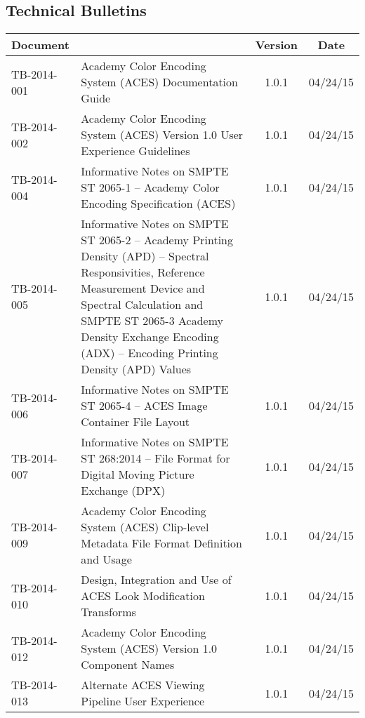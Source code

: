 \documentclass[10pt]{academydoc}
\begin{document}
\subsection*{Technical Bulletins}
\begin{tabularx}{\linewidth}{|l X|c|c|}
\hline
\textbf{Document} & & \textbf{Version} & \textbf{Date} \\ \hline
TB-2014-001 & Academy Color Encoding System (ACES) Documentation Guide & 1.0.1 & 04/24/15 \\ \hline
TB-2014-002 & Academy Color Encoding System (ACES) Version 1.0 User Experience Guidelines & 1.0.1 & 04/24/15 \\ \hline
TB-2014-004 & Informative Notes on SMPTE ST 2065-1 -- Academy Color Encoding Specification (ACES) & 1.0.1 & 04/24/15 \\ \hline
TB-2014-005 & Informative Notes on SMPTE ST 2065-2 -- Academy Printing Density (APD) -- Spectral Responsivities, Reference Measurement Device and Spectral Calculation and SMPTE ST 2065-3 Academy Density Exchange Encoding (ADX) -- Encoding Printing Density (APD) Values & 1.0.1 & 04/24/15 \\ \hline
TB-2014-006 & Informative Notes on SMPTE ST 2065-4 -- ACES Image Container File Layout & 1.0.1 & 04/24/15 \\ \hline
TB-2014-007 & Informative Notes on SMPTE ST 268:2014 -- File Format for Digital Moving Picture Exchange (DPX) & 1.0.1 & 04/24/15 \\ \hline
TB-2014-009 & Academy Color Encoding System (ACES) Clip-level Metadata File Format Definition and Usage & 1.0.1 & 04/24/15 \\ \hline
TB-2014-010 & Design, Integration and Use of ACES Look Modification Transforms & 1.0.1 & 04/24/15 \\ \hline
TB-2014-012 & Academy Color Encoding System (ACES) Version 1.0 Component Names & 1.0.1 & 04/24/15 \\ \hline
TB-2014-013 & Alternate ACES Viewing Pipeline User Experience & 1.0.1 & 04/24/15 \\ \hline
\end{tabularx}
\end{document}
